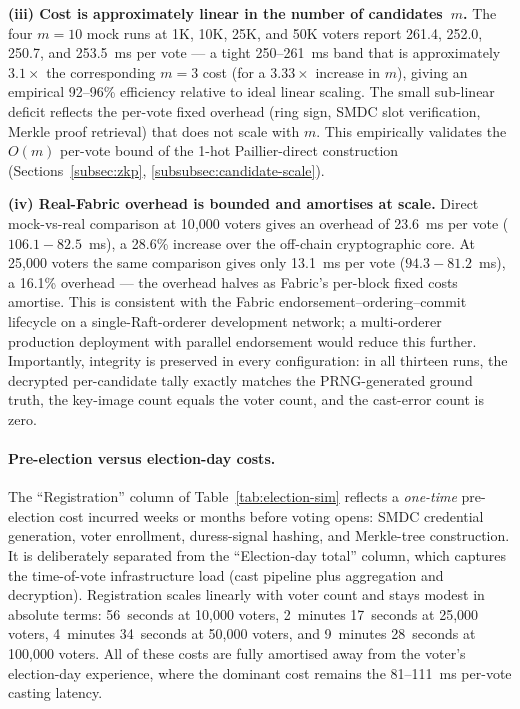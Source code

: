\textbf{(iii) Cost is approximately linear in the number of candidates~$m$.} The four $m=10$ mock runs at 1K, 10K, 25K, and 50K voters report 261.4, 252.0, 250.7, and 253.5~ms per vote --- a tight 250--261~ms band that is approximately $3.1\times$ the corresponding $m=3$ cost (for a $3.33\times$ increase in $m$), giving an empirical 92--96\% efficiency relative to ideal linear scaling. The small sub-linear deficit reflects the per-vote fixed overhead (ring sign, SMDC slot verification, Merkle proof retrieval) that does not scale with $m$. This empirically validates the $O(m)$ per-vote bound of the 1-hot Paillier-direct construction (Sections~\ref{subsec:zkp}, \ref{subsubsec:candidate-scale}).

\textbf{(iv) Real-Fabric overhead is bounded and amortises at scale.} Direct mock-vs-real comparison at 10{,}000 voters gives an overhead of 23.6~ms per vote ($106.1 - 82.5$~ms), a 28.6\% increase over the off-chain cryptographic core. At 25{,}000 voters the same comparison gives only 13.1~ms per vote ($94.3 - 81.2$~ms), a 16.1\% overhead --- the overhead halves as Fabric's per-block fixed costs amortise. This is consistent with the Fabric endorsement--ordering--commit lifecycle on a single-Raft-orderer development network; a multi-orderer production deployment with parallel endorsement would reduce this further. Importantly, integrity is preserved in every configuration: in all thirteen runs, the decrypted per-candidate tally exactly matches the PRNG-generated ground truth, the key-image count equals the voter count, and the cast-error count is zero.

\paragraph{Pre-election versus election-day costs.} The ``Registration'' column of Table~\ref{tab:election-sim} reflects a \emph{one-time} pre-election cost incurred weeks or months before voting opens: SMDC credential generation, voter enrollment, duress-signal hashing, and Merkle-tree construction. It is deliberately separated from the ``Election-day total'' column, which captures the time-of-vote infrastructure load (cast pipeline plus aggregation and decryption). Registration scales linearly with voter count and stays modest in absolute terms: 56~seconds at 10{,}000 voters, 2~minutes 17~seconds at 25{,}000 voters, 4~minutes 34~seconds at 50{,}000 voters, and 9~minutes 28~seconds at 100{,}000 voters. All of these costs are fully amortised away from the voter's election-day experience, where the dominant cost remains the 81--111~ms per-vote casting latency.


